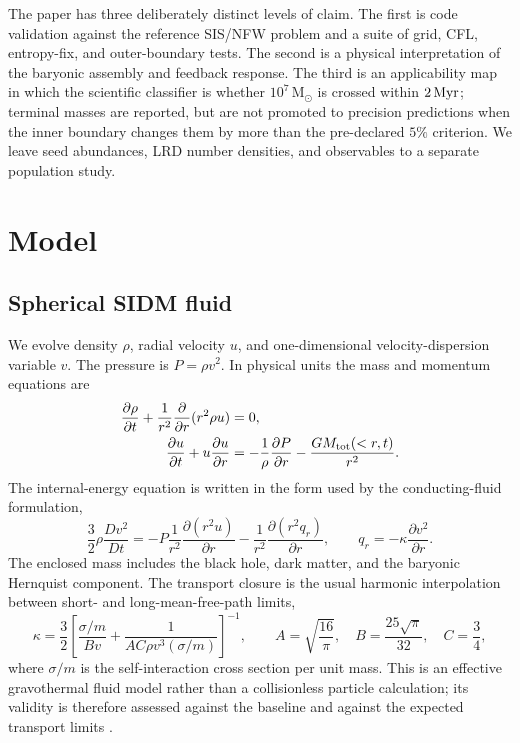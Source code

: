 \documentclass[11pt]{article}
\newcommand{\msun}{\,\mathrm{M}_{\odot}}
\begin{document}
The paper has three deliberately distinct levels of claim.  The first is code validation against the reference SIS/NFW problem and a suite of grid, CFL, entropy-fix, and outer-boundary tests.  The second is a physical interpretation of the baryonic assembly and feedback response.  The third is an applicability map in which the scientific classifier is whether $10^7\msun$ is crossed within $2\,{\rm Myr}$; terminal masses are reported, but are not promoted to precision predictions when the inner boundary changes them by more than the pre-declared $5\%$ criterion.  We leave seed abundances, LRD number densities, and observables to a separate population study.

\section{Model}
\label{sec:model}

\subsection{Spherical SIDM fluid}

We evolve density $\rho$, radial velocity $u$, and one-dimensional velocity-dispersion variable $v$.  The pressure is $P=\rho v^2$.  In physical units the mass and momentum equations are
\begin{align}
 \frac{\partial \rho}{\partial t} + \frac{1}{r^2}\frac{\partial}{\partial r}(r^2\rho u) &= 0, \\
 \frac{\partial u}{\partial t}+u\frac{\partial u}{\partial r} &= -\frac{1}{\rho}\frac{\partial P}{\partial r} - \frac{G M_{\rm tot}(<r,t)}{r^2} .
\end{align}
The internal-energy equation is written in the form used by the conducting-fluid formulation,
\begin{equation}
 \frac{3}{2}\rho\frac{D v^2}{D t} = -P\frac{1}{r^2}\frac{\partial (r^2u)}{\partial r} - \frac{1}{r^2}\frac{\partial (r^2q_r)}{\partial r},
 \qquad q_r=-\kappa\frac{\partial v^2}{\partial r} .
 \label{eq:energy}
\end{equation}
The enclosed mass includes the black hole, dark matter, and the baryonic Hernquist component.  The transport closure is the usual harmonic interpolation between short- and long-mean-free-path limits,
\begin{equation}
 \kappa = \frac{3}{2}\left[\frac{\sigma/m}{Bv} + \frac{1}{A C\rho v^3(\sigma/m)}\right]^{-1},
 \qquad A=\sqrt{\frac{16}{\pi}},\quad B=\frac{25\sqrt{\pi}}{32},\quad C=\frac{3}{4} ,
 \label{eq:kappa}
\end{equation}
where $\sigma/m$ is the self-interaction cross section per unit mass.  This is an effective gravothermal fluid model rather than a collisionless particle calculation; its validity is therefore assessed against the baseline and against the expected transport limits \citep{Balberg2002,KodaShapiro2011,Outmezguine2023}.
\end{document}
